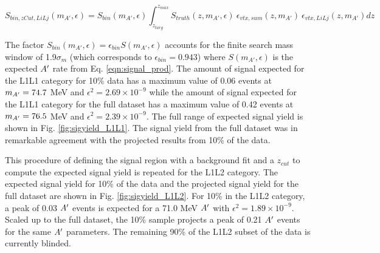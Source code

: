 \begin{equation}
S_{bin,zCut,LiLj}(m_{A'},\epsilon) = S_{bin}(m_{A'},\epsilon) \int_{z_{targ}}^{z_{max}} S_{truth}(z,m_{A'},\epsilon) \ \epsilon_{vtx,sum}(z,m_{A'}) \ \epsilon_{vtx,LiLj}(z,m_{A'})dz
    \label{eqn:signal_yield}
\end{equation}

The factor $S_{bin}(m_{A'},\epsilon)=\epsilon_{bin}  S(m_{A'},\epsilon)$ accounts for the finite search mass window of 1.9$\sigma_m$ (which corresponds to $\epsilon_{bin} = 0.943$) where $S(m_{A'},\epsilon)$ is the expected $A^\prime$ rate from Eq. \ref{eqn:signal_prod}. The amount of signal expected for the L1L1 category for 10\% data has a maximum value of 0.06 events at $m_{A^\prime}=74.7$ MeV and $\epsilon^2=2.69 \times 10^{-9}$ while the amount of signal expected for the L1L1 category for the full dataset has a maximum value of 0.42 events at $m_{A^\prime}=76.5$ MeV and $\epsilon^2=2.39 \times 10^{-9}$. The full range of expected signal yield is shown in Fig. \ref{fig:sigyield_L1L1}. The signal yield from the full dataset was in remarkable agreement with the projected results from 10\% of the data. %

This procedure of defining the signal region with a background fit and a $z_{cut}$ to compute the expected signal yield is repeated for the L1L2 category. The expected signal yield for 10\% of the data and the projected signal yield for the full dataset are shown in Fig. \ref{fig:sigyield_L1L2}. For 10\% in the L1L2 category, a peak of 0.03 $A^\prime$ events is expected for a 71.0 MeV $A^\prime$ with $\epsilon^2=1.89 \times 10^{-9}$. Scaled up to the full dataset, the 10\% sample projects a peak of 0.21 $A^\prime$ events for the same $A^\prime$ parameters. The remaining 90\% of the L1L2 subset of the data is currently blinded.



